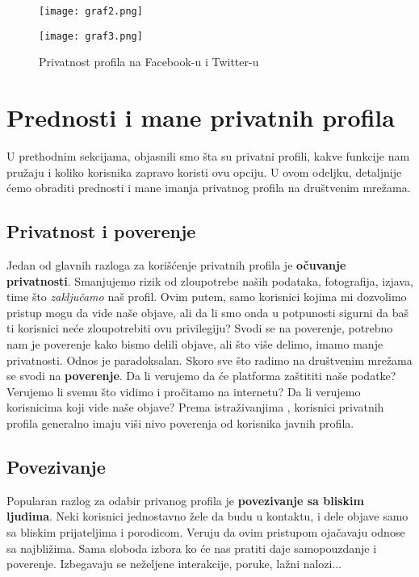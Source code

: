 \documentclass[12pt, a4paper]{article}
\begin{document}
{\begin{figure}
\centering
\begin{minipage}{.5\textwidth}
  \centering
  \texttt{[image: graf2.png]}
  \label{fig:test1}
\end{minipage}%
\begin{minipage}{.5\textwidth}
  \centering
  \texttt{[image: graf3.png]}
  \label{fig:test2}
\end{minipage}

  \caption{Privatnost profila na Facebook-u i Twitter-u}
\end{figure}


\newpage

\section{Prednosti i mane privatnih profila}
U prethodnim sekcijama, objasnili smo šta su privatni profili, kakve funkcije nam pružaju i koliko korisnika zapravo koristi ovu opciju. U ovom odeljku, detaljnije ćemo obraditi prednosti i mane imanja privatnog profila na društvenim mrežama.

\subsection{Privatnost i poverenje}
Jedan od glavnih razloga za korišćenje privatnih profila je \textbf{očuvanje privatnosti}. 
Smanjujemo rizik od zloupotrebe naših podataka, fotografija, izjava, time što \textit{zaključamo} naš profil. 
Ovim putem, samo korisnici kojima mi dozvolimo pristup mogu da vide naše objave, ali da li smo onda u potpunosti sigurni da baš ti korisnici neće zloupotrebiti ovu privilegiju? Svodi se na poverenje, potrebno nam je poverenje kako bismo delili objave, ali što više delimo, imamo manje privatnosti. Odnos je paradoksalan.
Skoro sve što radimo na društvenim mrežama se svodi na \textbf{poverenje}. Da li verujemo da će platforma zaštititi naše podatke? Verujemo li svemu što vidimo i pročitamo na internetu? Da li verujemo korisnicima koji vide naše objave?
Prema istraživanjima \cite{cyberology}, korisnici privatnih profila generalno imaju viši nivo poverenja od korisnika javnih profila.

\subsection{Povezivanje}
Popularan razlog za odabir privanog profila je \textbf{povezivanje sa bliskim ljudima}. Neki korisnici jednostavno žele da budu u kontaktu, i dele objave samo sa bliskim prijateljima i porodicom. Veruju da ovim pristupom ojačavaju odnose sa najbližima. Sama sloboda izbora ko će nas pratiti daje samopouzdanje i poverenje. Izbegavaju se neželjene interakcije, poruke, lažni nalozi...

}
\end{document}
